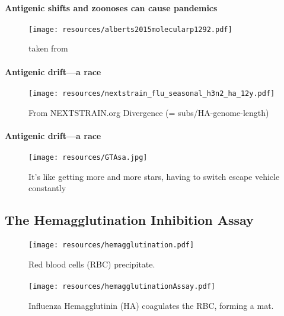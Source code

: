 \documentclass{beamer}
\begin{document}
\begin{darkframes}
    \begin{frame}{\subsecname}
      \framesubtitle{Antigenic shifts and zoonoses can cause pandemics}
      \begin{figure}
        \texttt{[image: resources/alberts2015molecularp1292.pdf]}
        \caption{taken from \cite{alberts15}}
      \end{figure}{}
    \end{frame}{}

    \begin{frame}{\subsecname}
      \framesubtitle{Antigenic drift---a race}
      \begin{figure}
        \texttt{[image: resources/nextstrain\_flu\_seasonal\_h3n2\_ha\_12y.pdf]}
        \caption{\footnotesize From NEXTSTRAIN.org Divergence (= subs/HA-genome-length)}
      \end{figure}
    \end{frame}

    \begin{frame}{\subsecname}
      \framesubtitle{Antigenic drift---a race}
      \begin{figure}
        \texttt{[image: resources/GTAsa.jpg]}
        \caption{\footnotesize It's like getting more and more stars, having to switch escape vehicle constantly}
      \end{figure}
    \end{frame}

    \subsection{The Hemagglutination Inhibition Assay}
    \begin{frame}{\subsecname}
      \framesubtitle{}
      \begin{figure}
        \texttt{[image: resources/hemagglutination.pdf]}
        \caption{Red blood cells (RBC) precipitate.}
      \end{figure}
    \end{frame}

    \begin{frame}{\subsecname}
      \framesubtitle{}
      \begin{figure}
        \texttt{[image: resources/hemagglutinationAssay.pdf]}
        \caption{Influenza Hemagglutinin (HA) coagulates the RBC, forming a mat.}
      \end{figure}
    \end{frame}


\end{darkframes}
\end{document}
